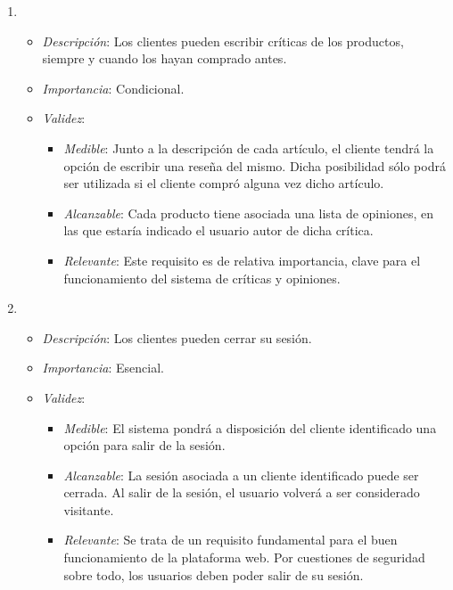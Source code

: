 \begin{enumerate}[{\bf RF-1}]
\item 
  \begin{itemize}
  \item \textit{Descripción}: Los clientes pueden escribir críticas de los productos, siempre y cuando los hayan comprado antes.
  \item \textit{Importancia}: Condicional.
  \item \textit{Validez}:
    \begin{itemize}
    \item \textit{Medible}: Junto a la descripción de cada artículo, el cliente tendrá la opción de escribir una reseña del mismo. Dicha posibilidad sólo podrá ser utilizada si el cliente compró alguna vez dicho artículo.
    \item \textit{Alcanzable}: Cada producto tiene asociada una lista de opiniones, en las que estaría indicado el usuario autor de dicha crítica.
    \item \textit{Relevante}: Este requisito es de relativa importancia, clave para el funcionamiento del sistema de críticas y opiniones. 
    \end{itemize}
  \end{itemize}

\item 
  \begin{itemize}
  \item \textit{Descripción}: Los clientes pueden cerrar su sesión.
  \item \textit{Importancia}: Esencial.
  \item \textit{Validez}:
    \begin{itemize}
    \item \textit{Medible}: El sistema pondrá a disposición del cliente identificado una opción para salir de la sesión.
    \item \textit{Alcanzable}: La sesión asociada a un cliente identificado puede ser cerrada. Al salir de la sesión, el usuario volverá a ser considerado visitante.
    \item \textit{Relevante}: Se trata de un requisito fundamental para el buen funcionamiento de la plataforma web. Por cuestiones de seguridad sobre todo, los usuarios deben poder salir de su sesión.
    \end{itemize}
  \end{itemize}


\end{enumerate}
